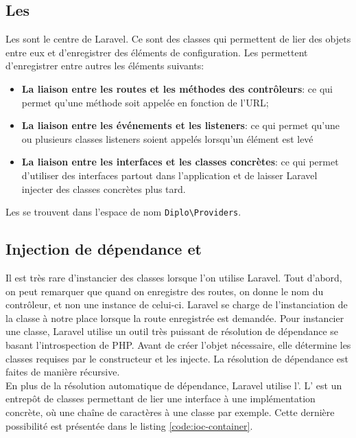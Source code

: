 	\subsection{Les \servicesProvider{}}
		Les \servicesProvider{} sont le centre de Laravel. Ce sont des classes qui permettent de lier des objets entre eux et d'enregistrer des éléments de configuration. Les \servicesProvider{} permettent d'enregistrer entre autres les éléments suivants:
		\begin{itemize}
			\item \textbf{La liaison entre les routes et les méthodes des contrôleurs}: ce qui permet qu'une méthode soit appelée en fonction de l'URL;
			\item \textbf{La liaison entre les événements et les listeners}: ce qui permet qu'une ou plusieurs classes listeners soient appelés lorsqu'un élément est levé
			\item \textbf{La liaison entre les interfaces et les classes concrètes}: ce qui permet d'utiliser des interfaces partout dans l'application et de laisser Laravel injecter des classes concrètes plus tard.
		\end{itemize}\bigskip

		Les \servicesProvider{} se trouvent dans l'espace de nom \verb|Diplo\Providers|.

	\subsection{Injection de dépendance et \ioc{}}
	\label{subsec:ioc}
		Il est très rare d'instancier des classes lorsque l'on utilise Laravel. Tout d'abord, on peut remarquer que quand on enregistre des routes, on donne le nom du contrôleur, et non une instance de celui-ci. Laravel se charge de l'instanciation de la classe à notre place lorsque la route enregistrée est demandée. Pour instancier une classe, Laravel utilise un outil très puissant de résolution de dépendance se basant l'introspection de PHP. Avant de créer l'objet nécessaire, elle détermine les classes requises par le constructeur et les injecte. La résolution de dépendance est faites de manière récursive.\\

		En plus de la résolution automatique de dépendance, Laravel utilise l'\ioc{}. L'\ioc{} est un entrepôt de classes permettant de lier une interface à une implémentation concrète, où une chaîne de caractères à une classe par exemple. Cette dernière possibilité est présentée dans le listing \ref{code:ioc-container}.

